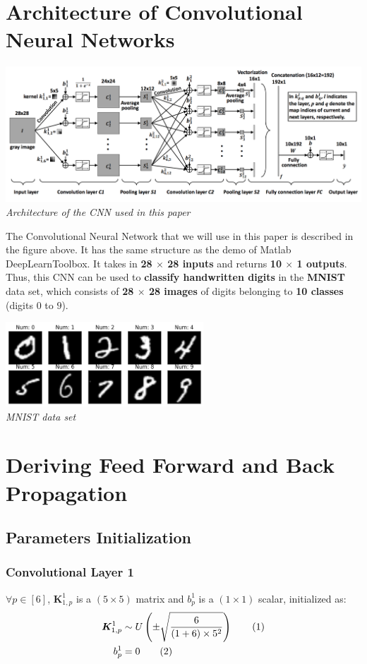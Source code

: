 \documentclass[12pt]{article}
\newcommand\numberthis{\stepcounter{equation}\tag{\theequation}}
\begin{document}
\section{Architecture of Convolutional Neural Networks}
\begin{center}
    \includegraphics[width=\textwidth]{CNN-architecture.png}\\
    \textit{Architecture of the CNN used in this paper}
\end{center}
The Convolutional Neural Network that we will use in this paper is described in the figure above. It has the same structure as the demo of Matlab DeepLearnToolbox. It takes in \textbf{28 $\times$ 28 inputs} and returns \textbf{10 $\times$ 1 outputs}. Thus, this CNN can be used to \textbf{classify handwritten digits} in the \textbf{MNIST} data set, which consists of \textbf{28 $\times$ 28 images} of digits belonging to \textbf{10 classes} (digits $0$ to $9$).
\begin{center}
    \includegraphics[width=280px]{mnist.png}\\
    \textit{MNIST data set}
\end{center}

\section{Deriving Feed Forward and Back Propagation}
\subsection{Parameters Initialization}
\subsubsection{Convolutional Layer 1}
$\forall p \in [6]$, $\bm{K}^1_{1,p}$ is a $(5 \times 5)$ matrix and $b^1_p$ is a $(1 \times 1)$ scalar, initialized as:
\begin{align*}
    \bm{K}^1_{1,p} &\sim U\left(\pm \sqrt{\frac{6}{(1 + 6) \times 5^2}}\right)
    \numberthis
    \\
    b^1_p &= 0
    \numberthis
\end{align*}
\end{document}
